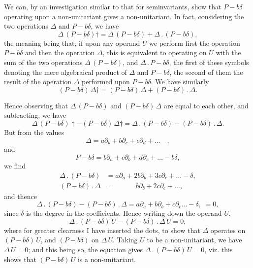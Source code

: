 \documentclass[11pt,a4paper]{book}
\begin{document}
\setcounter{art}{26}
\begin{art}
We can, by an investigation similar to that for seminvariants, show that $P - b\delta$ operating upon a non-unitariant gives a non-unitariant. In fact, considering the two operations $\Delta$ and $P - b\delta$, we have
\[
\Delta\,(P - b\delta)\dagger = \Delta\,(P - b\delta) + \Delta\,.\,(P - b\delta),
\]
the meaning being that, if upon any operand $U$ we perform first the operation $P - b\delta$ and then the operation $\Delta$, this is equivalent to operating on $U$ with the sum of the two operations $\Delta\,(P - b\delta)$, and $\Delta\,.\,P - b\delta$, the first of these symbols denoting the mere algebraical product of $\Delta$ and $P - b\delta$, the second of them the result of the operation $\Delta$ performed upon $P - b\delta$. We have similarly
\[
(P - b\delta)\,\Delta\dagger = (P - b\delta)\,\Delta + (P - b\delta)\,.\,\Delta.
\]

Hence observing that $\Delta\,(P - b\delta)$ and $(P - b\delta)\,\Delta$ are equal to each other, and subtracting, we have
\[
\Delta\,(P - b\delta)\dagger - (P - b\delta)\,\Delta\dagger = \Delta\,.\,(P - b\delta) - (P - b\delta)\,.\,\Delta.
\]
But from the values
\[
\Delta = a\partial_{b} + b\partial_{c} + c\partial_{d} + \ldots\quad,
\]
and
\[
P - b\delta = b\partial_{a} + c\partial_{b} + d\partial_{c} + \ldots - b\delta,
\]
we find
\begin{align*}
\Delta\,.\,(P - b\delta) &= a\partial_{a} + 2b\partial_{b} + 3c\partial_{c} + \ldots - \delta,\\
(P - b\delta)\,.\,\Delta &= \phantom{a\partial_{a} +}\; b\partial_{b} + 2c\partial_{c} + \ldots,
\end{align*}
and thence
\[
\Delta\,.\,(P - b\delta) - (P - b\delta)\,.\,\Delta = a\partial_{a} + b\partial_{b} + c\partial_{c} \ldots - \delta,\; = 0,
\]
since $\delta$ is the degree in the coefficients. Hence writing down the operand $U$,
\[
\Delta\,.\,(P - b\delta)\,U - (P - b\delta)\,.\,\Delta\,U = 0,
\]
where for greater clearness I have inserted the dots, to show that $\Delta$ operates on $(P - b\delta)\,U$, and $(P - b\delta)$ on $\Delta\,U$. Taking $U$ to be a non-unitariant, we have $\Delta\,U = 0$; and this being so, the equation gives $\Delta\,.\,(P - b\delta)\,U = 0$, viz. this shows that $(P - b\delta)\,U$ is a non-unitariant.
\end{art}
\end{document}

